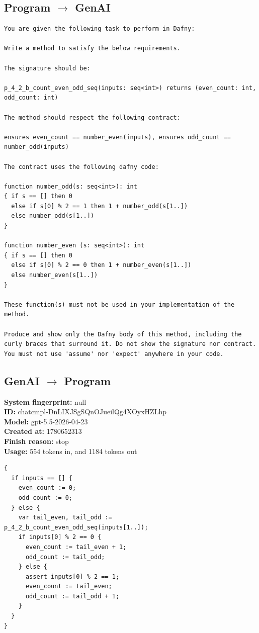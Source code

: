 \documentclass{article}
\begin{document}
\subsection*{Program $\rightarrow$ GenAI}
\begin{lstlisting}
You are given the following task to perform in Dafny:

Write a method to satisfy the below requirements.

The signature should be:

p_4_2_b_count_even_odd_seq(inputs: seq<int>) returns (even_count: int, odd_count: int)

The method should respect the following contract:

ensures even_count == number_even(inputs), ensures odd_count == number_odd(inputs)

The contract uses the following dafny code:

function number_odd(s: seq<int>): int
{ if s == [] then 0
  else if s[0] % 2 == 1 then 1 + number_odd(s[1..])
  else number_odd(s[1..])
}

function number_even (s: seq<int>): int
{ if s == [] then 0
  else if s[0] % 2 == 0 then 1 + number_even(s[1..])
  else number_even(s[1..])
}

These function(s) must not be used in your implementation of the method.

Produce and show only the Dafny body of this method, including the curly braces that surround it. Do not show the signature nor contract. You must not use 'assume' nor 'expect' anywhere in your code.
\end{lstlisting}
\subsection*{GenAI $\rightarrow$ Program}
\textbf{System fingerprint: }null
\\\textbf{ID: }chatcmpl-DnLIXJSgSQnOJueilQg4XOyxHZLhp
\\\textbf{Model: }gpt-5.5-2026-04-23
\\\textbf{Created at: }1780652313
\\\textbf{Finish reason: }stop
\\\textbf{Usage: }554 tokens in, and 1184 tokens out
\begin{lstlisting}
{
  if inputs == [] {
    even_count := 0;
    odd_count := 0;
  } else {
    var tail_even, tail_odd := p_4_2_b_count_even_odd_seq(inputs[1..]);
    if inputs[0] % 2 == 0 {
      even_count := tail_even + 1;
      odd_count := tail_odd;
    } else {
      assert inputs[0] % 2 == 1;
      even_count := tail_even;
      odd_count := tail_odd + 1;
    }
  }
}
\end{lstlisting}
\end{document}
